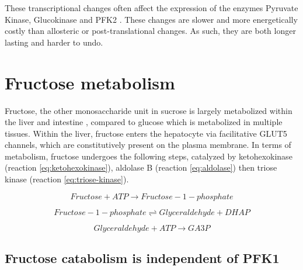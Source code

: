 \documentclass{tufte-handout}
\begin{document}
These transcriptional changes often affect the expression of the enzymes Pyruvate Kinase, Glucokinase and PFK2 \citep{Semenza1994,Kawaguchi2001}.  These changes are slower and more energetically costly than allosteric or post-translational changes.  As such, they are both longer lasting and harder to undo.

\section{Fructose metabolism}

Fructose, the other monosaccharide unit in sucrose is largely metabolized within the liver and intestine  , compared to glucose which is metabolized in multiple tissues.  Within the liver, fructose enters the hepatocyte via facilitative GLUT5 channels, which are constitutively present on the plasma membrane. In terms of metabolism, fructose undergoes the following steps, catalyzed by ketohexokinase (reaction \ref{eq:ketohexokinase}), aldolase B (reaction \ref{eq:aldolase}) then triose kinase (reaction \ref{eq:triose-kinase}).

\begin{equation}\label{eq:ketohexokinase}
Fructose + ATP \rightarrow Fructose-1-phosphate
\end{equation}

\begin{equation}\label{eq:aldolase}
Fructose-1-phosphate \rightleftharpoons Glyceraldehyde + DHAP
\end{equation}

\begin{equation}\label{eq:triose-kinase}
Glyceraldehyde + ATP \rightarrow GA3P
\end{equation}


\subsection{Fructose catabolism is independent of PFK1}
\end{document}
